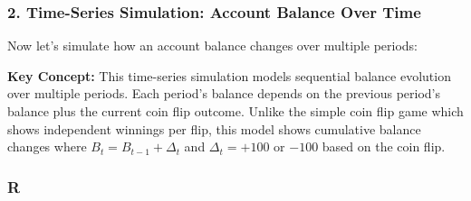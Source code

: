 \documentclass[
  letterpaper,
  DIV=11,
  numbers=noendperiod]{scrartcl}
\theoremstyle{definition}
\theoremstyle{remark}
\begin{document}
\subsubsection{2. Time-Series Simulation: Account Balance Over
Time}\label{time-series-simulation-account-balance-over-time}

Now let's simulate how an account balance changes over multiple periods:

\textbf{Key Concept:} This time-series simulation models sequential
balance evolution over multiple periods. Each period's balance depends
on the previous period's balance plus the current coin flip outcome.
Unlike the simple coin flip game which shows independent winnings per
flip, this model shows cumulative balance changes where
\(B_t = B_{t-1} + \Delta_t\) and \(\Delta_t = +100\) or \(-100\) based
on the coin flip.

\subsubsection{R}
\end{document}
